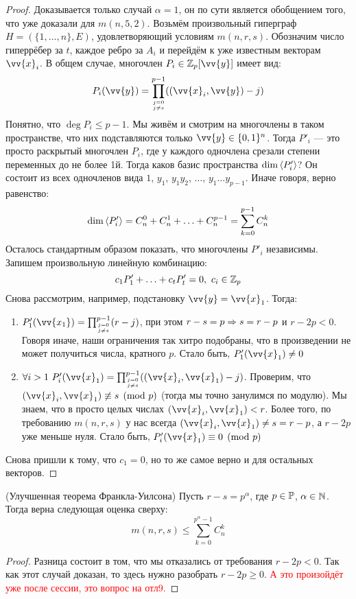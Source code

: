 \begin{proof}
	Доказывается только случай $\alpha = 1$, он по сути является обобщением того, что уже доказали для $m(n, 5, 2)$. Возьмём произвольный гиперграф $H = (\{1, \ldots, n\}, E)$, удовлетворяющий условиям $m(n, r, s)$. Обозначим число гиперрёбер за $t$, каждое ребро за $A_i$ и перейдём к уже известным векторам $\vv{x}_i$. В общем случае, многочлен $P_i \in \Z_p[\vv{y}]$ имеет вид:
	\[
		P_i(\vv{y}) = \prod_{j = 0 \atop {j \neq s}}^{p - 1} ((\vv{x}_i, \vv{y}) - j)
	\]
	Понятно, что $\deg P_i \le p - 1$. Мы живём и смотрим на многочлены в таком пространстве, что  них подставляются только $\vv{y} \in \{0, 1\}^n$. Тогда $P'_i$ --- это просто раскрытый многочлен $P_i$, где у каждого одночлена срезали степени переменных до не более 1й. Тогда каков базис пространства $\dim \left\langle P'_i\right\rangle$? Он состоит из всех одночленов вида $1$, $y_1$, $y_1y_2$, $\ldots$, $y_1\ldots y_{p - 1}$. Иначе говоря, верно равенство:
	\[
		\dim \left\langle P'_i\right\rangle = C_n^0 + C_n^1 + \ldots + C_n^{p - 1} = \sum_{k = 0}^{p - 1} C_n^k
	\]
	Осталось стандартным образом показать, что многочлены $P'_i$ независимы. Запишем произвольную линейную комбинацию:
	\[
		c_1P'_1 + \ldots + c_tP'_t = 0,\ c_i \in \mathbb{Z}_p
	\]
	Снова рассмотрим, например, подстановку $\vv{y} = \vv{x}_1$. Тогда:
	\begin{enumerate}
		\item $P'_1(\vv{x_1}) = \prod_{j = 0 \atop {j \neq s}}^{p - 1} (r - j)$, при этом $r - s = p \Rightarrow s = r - p$ и $r - 2p < 0$. Говоря иначе, наши ограничения так хитро подобраны, что в произведении не может получиться числа, кратного $p$. Стало быть, $P'_1(\vv{x}_1) \neq 0$
		
		\item $\forall i > 1\ P'_i(\vv{x}_1) = \prod_{j = 0 \atop {j \neq s}}^{p - 1} ((\vv{x}_i, \vv{x}_1) - j)$. Проверим, что $(\vv{x}_i, \vv{x}_1) \centernot\equiv s \pmod p$ (тогда мы точно занулимся по модулю). Мы знаем, что в просто целых числах $(\vv{x}_i, \vv{x}_1) < r$. Более того, по требованию $m(n, r, s)$ у нас всегда $(\vv{x}_i, \vv{x}_1) \neq s = r - p$, а $r - 2p$ уже меньше нуля. Стало быть, $P'_i(\vv{x}_1) \equiv 0 \pmod p$
	\end{enumerate}
	Снова пришли к тому, что $c_1 = 0$, но то же самое верно и для остальных векторов.
\end{proof}

\begin{theorem} (Улучшенная теорема Франкла-Уилсона)
	Пусть $r - s = p^\alpha$, где $p \in \mathbb{P}$, $\alpha \in \mathbb{N}$. Тогда верна следующая оценка сверху:
	\[
		m(n, r, s) \le \sum_{k = 0}^{p^\alpha - 1} C_n^k
	\]
\end{theorem}

\begin{proof}
	Разница состоит в том, что мы отказались от требования $r - 2p < 0$. Так как этот случай доказан, то здесь нужно разобрать $r - 2p \ge 0$. \textcolor{red}{А это произойдёт уже после сессии, это вопрос на отл9.}
\end{proof}